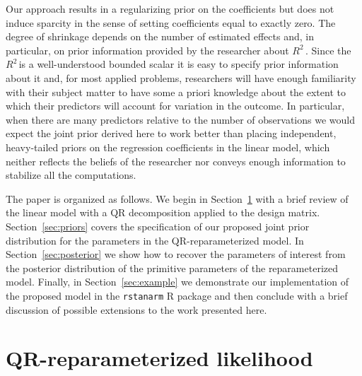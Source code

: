 \documentclass[11pt]{article}
\newcommand{\Rsq}{$R^2\,$}
\begin{document}
Our approach results in a regularizing prior on the coefficients but does not
induce sparcity in the sense of setting coefficients equal to exactly zero. The
degree of shrinkage depends on the number of estimated effects and, in
particular, on prior information provided by the researcher about \Rsq. Since
the \Rsq is a well-understood bounded scalar it is easy to specify prior
information about it and, for most applied problems, researchers will have
enough familiarity with their subject matter to have some a priori knowledge
about the extent to which their predictors will account for variation in the
outcome. In particular, when there are many predictors relative to the number of
observations we would expect the joint prior derived here to work better than
placing independent, heavy-tailed priors on the regression coefficients in the
linear model, which neither reflects the beliefs of the researcher nor conveys
enough information to stabilize all the computations.

The paper is organized as follows. We begin in Section~\ref{sec:likelihood} with
a brief review of the linear model with a QR decomposition applied to the design
matrix. Section~\ref{sec:priors} covers the specification of our proposed joint
prior distribution for the parameters in the QR-reparameterized model. In
Section~\ref{sec:posterior} we show how to recover the parameters of interest
from the posterior distribution of the primitive parameters of the
reparameterized model. Finally, in Section~\ref{sec:example} we demonstrate our
implementation of the proposed model in the {\tt rstanarm} R package and then
conclude with a brief discussion of possible extensions to the work presented
here.


\section{QR-reparameterized likelihood}
\label{sec:likelihood}
\end{document}
